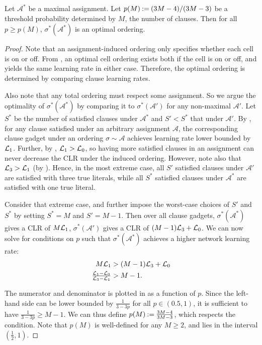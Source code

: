 \begin{lemma} \label{lemma:bayes_bestOrder}
    Let $\mathcal{A}^*$ be a maximal assignment.  Let $p(M) \mathbin{:=} (3M-4)/(3M-3)$ be a threshold probability determined by $M$, the number of clauses. Then for all $p \geq p(M) $, $\sigma^*(\mathcal{A}^*)$ is an optimal ordering.
\end{lemma}
\begin{proof}
    Note that an assignment-induced ordering only specifies whether each cell is on or off. From ,  an optimal cell ordering exists both if the cell is on or off, and yields the same learning rate in either case. Therefore, the optimal ordering is determined by comparing clause learning rates. 
    
    Also note that any total ordering must respect some assignment. So we argue the optimality of $\sigma^*(\mathcal{A}^*)$ by comparing it to $\sigma^*(\mathcal{A}')$ for any non-maximal $\mathcal{A'}$. Let $S^*$ be the number of satisfied clauses under $\mathcal{A}^*$ and $S' < S^*$ that under $\mathcal{A'}$. By , for any clause satisfied under an arbitrary assignment $\mathcal{A}$, the corresponding clause gadget under an ordering $\sigma \sim \mathcal{A}$ achieves learning rate lower bounded by $\mathcal{L}_1$. Further, by , $\mathcal{L}_1 >\mathcal{L}_0$,  so having more satisfied clauses in an assignment can never decrease the CLR under the induced ordering. However, note also that $\mathcal{L}_3 >\mathcal{L}_1$  (by ). Hence, in the most extreme case, all $S'$ satisfied clauses under $\mathcal{A}'$ are satisfied with three true literals, while all $S^*$ satisfied clauses under $\mathcal{A}^*$ are satisfied with one true literal. 

    Consider that extreme case, and further impose the worst-case choices of $S'$ and $S^*$ by setting $S^* = M$ and $S' = M-1$. Then over all clause gadgets, $\sigma^*(\mathcal{A}^*)$ gives a CLR of $M \mathcal{L}_1$, $\sigma^*(\mathcal{A}')$ gives a CLR of $(M-1) \mathcal{L}_3 + \mathcal{L}_0$. We can now solve for conditions on $p$ such that $\sigma^*(\mathcal{A}^*)$ achieves a higher network learning rate:
    \begin{align*}
        M \mathcal{L}_1 &> (M-1) \mathcal{L}_3 + \mathcal{L}_0\\
        \tfrac{\mathcal{L}_1 - \mathcal{L}_0}{\mathcal{L}_3 - \mathcal{L}_1} &> M-1.
    \end{align*}
    
    The numerator and denominator is plotted in  as a function of $ p $.
    Since the left-hand side can be lower bounded by $\frac{1}{3-3p}$ for all $p \in (0.5,1)$, it is sufficient to have $ \frac 1{3-3p} \geq M-1 $.
    We can thus define $ p(M) \mathbin{:=} \frac{3M-4}{3M-3} $, which respects the condition. Note that $p(M)$ is well-defined for any $ M \geq 2 $, and lies in the interval $ (\frac 12, 1) $.
\end{proof}

